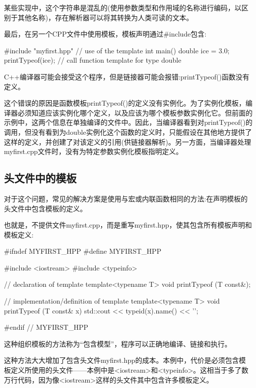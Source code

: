 \begin{notice}
某些实现中，这个字符串是混乱的(使用参数类型和作用域的名称进行编码，以区别于其他名称)，存在解析器可以将其转换为人类可读的文本。
\end{notice}

最后，在另一个CPP文件中使用模板，模板声明通过\#include包含:

\begin{cpp}
#include "myfirst.hpp"
// use of the template
int main()
{
	double ice = 3.0;
	printTypeof(ice); // call function template for type double
}
\end{cpp}

C++编译器可能会接受这个程序，但是链接器可能会报错:printTypeof()函数没有定义。

这个错误的原因是函数模板printTypeof()的定义没有实例化。为了实例化模板，编译器必须知道应该实例化哪个定义，以及应该为哪个模板参数实例化它。但前面的示例中，这两个信息在单独编译的文件中。因此，当编译器看到对printTypeof()的调用，但没有看到为double实例化这个函数的定义时，只能假设在其他地方提供了这样的定义，并创建了对该定义的引用(供链接器解析)。另一方面，当编译器处理myfirst.cpp文件时，没有为特定参数实例化模板指明定义。

\subsection{头文件中的模板}

对于这个问题，常见的解决方案是使用与宏或内联函数相同的方法:在声明模板的头文件中包含模板的定义。

也就是，不提供文件myfirst.cpp，而是重写myfirst.hpp，使其包含所有模板声明和模板定义:

\begin{cpp}
#ifndef MYFIRST_HPP
#define MYFIRST_HPP

#include <iostream>
#include <typeinfo>

// declaration of template
template<typename T>
void printTypeof (T const&);

// implementation/definition of template
template<typename T>
void printTypeof (T const& x)
{
	std::cout << typeid(x).name() << ’\n’;
}

#endif // MYFIRST_HPP
\end{cpp}

这种组织模板的方法称为“包含模型”，程序可以正确地编译、链接和执行。

这种方法大大增加了包含头文件myfirst.hpp的成本。本例中，代价是必须包含模板定义所使用的头文件——本例中是<iostream>和<typeinfo>。这相当于多了数万行代码，因为像<iostream>这样的头文件其中包含许多模板定义。

